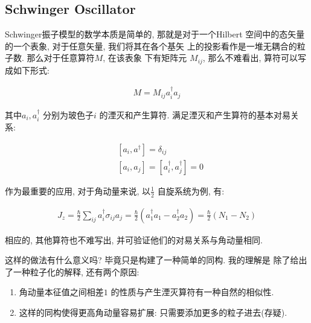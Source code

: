 \subsection{Schwinger Oscillator}

Schwinger振子模型的数学本质是简单的, 那就是对于一个Hilbert
空间中的态矢量的一个表象, 对于任意矢量, 我们将其在各个基矢
上的投影看作是一堆无耦合的粒子数. 那么对于任意算符$M$, 在该表象
下有矩阵元 $M_{ij}$, 那么不难看出, 算符可以写成如下形式:

\begin{equation}
  \begin{aligned}
    M = M_{ij}a^{\dagger}_{i}a_{j}
  \end{aligned}
\end{equation}

其中$a_{i},a_{i}^{\dagger}$ 分别为玻色子$i$ 的湮灭和产生算符.
满足湮灭和产生算符的基本对易关系:

\begin{equation}
  \begin{aligned}
    &[a_{i}, a^{\dagger}_{}] = \delta_{ij}\\
    &[a_{i}, a_{j}] = [a^{\dagger}_{i}, a_{j}^{\dagger}] = 0
  \end{aligned}
\end{equation}

作为最重要的应用, 对于角动量来说, 以$\frac{1}{2}$ 自旋系统为例,
有:

\begin{equation}
  \begin{aligned}
    J_{z} = \frac{\hbar}{2}\sum_{ij}a^{\dagger}_{i} \sigma_{ij} a_{j} = \frac{\hbar}{2}(a_1^{\dagger}a_1-a_2^{\dagger}a_2) = \frac{\hbar}{2}(N_1-N_2)
  \end{aligned}
\end{equation}

相应的, 其他算符也不难写出, 并可验证他们的对易关系与角动量相同.

\begin{remark}
  这样的做法有什么意义吗? 毕竟只是构建了一种简单的同构. 我的理解是
  除了给出了一种粒子化的解释, 还有两个原因:
  \begin{enumerate}
    \item 角动量本征值之间相差$1$ 的性质与产生湮灭算符有一种自然的相似性.
    \item 这样的同构使得更高角动量容易扩展: 只需要添加更多的粒子进去(存疑).
  \end{enumerate}
\end{remark}
